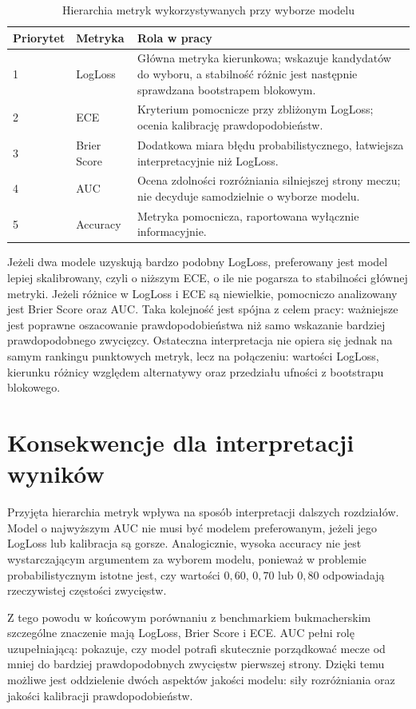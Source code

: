 \begin{table}[H]
    \centering
    \caption{Hierarchia metryk wykorzystywanych przy wyborze modelu}
    \label{tab:metric_hierarchy}
    \begin{tabular}{p{}p{}p{}}
        \toprule
        Priorytet & Metryka & Rola w pracy \\
        \midrule
        1 & LogLoss & Główna metryka kierunkowa; wskazuje kandydatów do wyboru, a stabilność różnic jest następnie sprawdzana bootstrapem blokowym. \\
        2 & ECE & Kryterium pomocnicze przy zbliżonym LogLoss; ocenia kalibrację prawdopodobieństw. \\
        3 & Brier Score & Dodatkowa miara błędu probabilistycznego, łatwiejsza interpretacyjnie niż LogLoss. \\
        4 & AUC & Ocena zdolności rozróżniania silniejszej strony meczu; nie decyduje samodzielnie o wyborze modelu. \\
        5 & Accuracy & Metryka pomocnicza, raportowana wyłącznie informacyjnie. \\
        \bottomrule
    \end{tabular}
\end{table}

Jeżeli dwa modele uzyskują bardzo podobny LogLoss, preferowany jest model lepiej skalibrowany, czyli o niższym ECE, o ile nie pogarsza to stabilności głównej metryki. Jeżeli różnice w LogLoss i ECE są niewielkie, pomocniczo analizowany jest Brier Score oraz AUC. Taka kolejność jest spójna z celem pracy: ważniejsze jest poprawne oszacowanie prawdopodobieństwa niż samo wskazanie bardziej prawdopodobnego zwycięzcy. Ostateczna interpretacja nie opiera się jednak na samym rankingu punktowych metryk, lecz na połączeniu: wartości LogLoss, kierunku różnicy względem alternatywy oraz przedziału ufności z bootstrapu blokowego.

\section{Konsekwencje dla interpretacji wyników}

Przyjęta hierarchia metryk wpływa na sposób interpretacji dalszych rozdziałów. Model o najwyższym AUC nie musi być modelem preferowanym, jeżeli jego LogLoss lub kalibracja są gorsze. Analogicznie, wysoka accuracy nie jest wystarczającym argumentem za wyborem modelu, ponieważ w problemie probabilistycznym istotne jest, czy wartości \(0{,}60\), \(0{,}70\) lub \(0{,}80\) odpowiadają rzeczywistej częstości zwycięstw.

Z tego powodu w końcowym porównaniu z benchmarkiem bukmacherskim szczególne znaczenie mają LogLoss, Brier Score i ECE. AUC pełni rolę uzupełniającą: pokazuje, czy model potrafi skutecznie porządkować mecze od mniej do bardziej prawdopodobnych zwycięstw pierwszej strony. Dzięki temu możliwe jest oddzielenie dwóch aspektów jakości modelu: siły rozróżniania oraz jakości kalibracji prawdopodobieństw.
